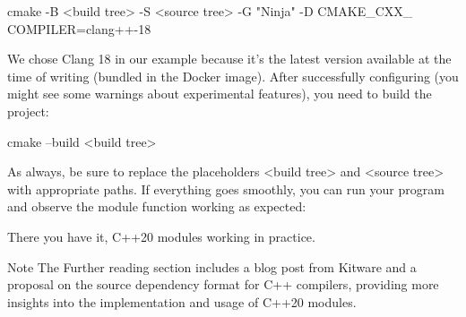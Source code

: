 \begin{shell}
cmake -B <build tree> -S <source tree> -G "Ninja" -D CMAKE_CXX_ COMPILER=clang++-18
\end{shell}

We chose Clang 18 in our example because it’s the latest version available at the time of writing (bundled in the Docker image). After successfully configuring (you might see some warnings about experimental features), you need to build the project:

\begin{shell}
cmake --build <build tree>
\end{shell}

As always, be sure to replace the placeholders <build tree> and <source tree> with appropriate paths. If everything goes smoothly, you can run your program and observe the module function working as expected:


There you have it, C++20 modules working in practice.

\begin{myNotic}{Note}
The Further reading section includes a blog post from Kitware and a proposal on the source dependency format for C++ compilers, providing more insights into the implementation and usage of C++20 modules.
\end{myNotic}

























